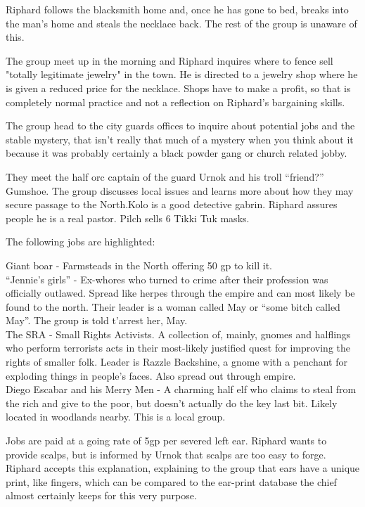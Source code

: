 Riphard follows the blacksmith home and, once he has gone to bed, breaks into the man’s home and steals the necklace back. The rest of the group is unaware of this.\medskip

The group meet up in the morning and Riphard inquires where to fence sell "totally legitimate jewelry" in the town. He is directed to a jewelry shop where he is given a reduced price for the necklace. Shops have to make a profit, so that is completely normal practice and not a reflection on Riphard's bargaining skills.\medskip

The group head to the city guards offices to inquire about potential jobs and the stable mystery, that isn’t really that much of a mystery when you think about it because it was probably certainly a black powder gang or church related jobby.\medskip

They meet the half orc captain of the guard Urnok and his troll “friend?” Gumshoe. The group discusses local issues and learns more about how they may secure passage to the North.Kolo is a good detective gabrin. Riphard assures people he is a real pastor. Pilch sells 6 Tikki Tuk masks.\medskip

The following jobs are highlighted:\medskip

    Giant boar - Farmsteads in the North offering 50 gp to kill it.\\
    “Jennie’s girls” - Ex-whores who turned to crime after their profession was officially outlawed. Spread like herpes through the empire and can most likely be found to the north. Their leader is a woman called May or “some bitch called May”. The group is told t'arrest her, May.\\
    The SRA - Small Rights Activists. A collection of, mainly, gnomes and halflings who perform terrorists acts in their most-likely justified quest for improving the rights of smaller folk. Leader is Razzle Backshine, a gnome with a penchant for exploding things in people’s faces. Also spread out through empire.\\
    Diego Escabar and his Merry Men - A charming half elf who claims to steal from the rich and give to the poor, but doesn’t actually do the key last bit. Likely located in woodlands nearby. This is a local group.\medskip

Jobs are paid at a going rate of 5gp per severed left ear. Riphard wants to provide scalps, but is informed by Urnok that scalps are too easy to forge. Riphard accepts this explanation, explaining to the group that ears have a unique print, like fingers, which can be compared to the ear-print database the chief almost certainly keeps for this very purpose.\medskip

